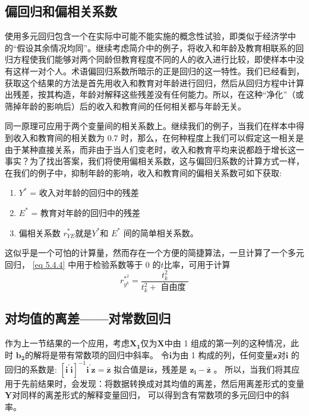 \subsection{偏回归和偏相关系数}

使用多元回归包含一个在实际中可能不能实施的概念性试验，即类似于经济学中的“假设其余情况均同”。继续考虑简介中的例子，将收入和年龄及教育相联系的回归方程使我们能够对两个同龄但教育程度不同的人的收入进行比较，即使样本中没有这样一对个人。术语偏回归系数所暗示的正是回归的这一特性。我们已经看到，获取这个结果的方法是首先用收入和教育对年龄进行回归，然后从回归方程中计算出残差，按其构造，年龄对解释这些残差没有任何能力。所以，在这种“净化”（或筛掉年龄的影响后）后的收入和教育间的任何相关都与年龄无关。

同一原理可应用于两个变量间的相关系数上。继续我们的例子，当我们在样本中得到收入和教育间的相关数为 0.7 时，那么，在何种程度上我们可以假定这一相关是由于某种直接关系，而非由于当人们变老时，收入和教育平均来说都趋于增长这一事实？为了找出答案，我们将使用偏相关系数，这与偏回归系数的计算方式一样，在我们的例子中，抑制年龄的影响，收入和教育间的偏相关系数可如下获取:
\begin{enumerate}
    \item $ Y^{*}$ = 收入对年龄的回归中的残差
    \item $ E^{*}$ = 教育对年龄的回归中的残差
    \item 偏相关系数 $ r_{YE}^{*}$就是$ Y^{*}$和 $ E^{*}$ 间的简单相关系数。
\end{enumerate}

这似乎是一个可怕的计算量，然而存在一个方便的简捷算法，一旦计算了一个多元回归， \ref{eq 5.4.4} 中用于检验系数等于 0 的$ t $比率，可用于计算
\begin{equation}
    r_{y^{k}}^{*^{2}} = \frac{t_{k}^{2}}{t_{k}^{2} + \text { 自由度 }}
\end{equation}

\subsection{对均值的离差——对常数回归}

作为上一节结果的一个应用，考虑$ \boldsymbol{ X_1 } $仅为$ \boldsymbol{ X } $中由 1 组成的第一列的这种情况，此时 $ \boldsymbol{ b_2 } $的解将是带有常数项的回归中斜率。
令$ \boldsymbol{ i } $为由 1 构成的列，任何变量$ \boldsymbol{ z } $对$ \boldsymbol{ i }$ 的回归的系数是:
$ \left[\boldsymbol{ i^{\prime} i}\right]^{-1} \boldsymbol{ i^{\prime} z=\bar{z}} $
拟合值是$ \boldsymbol{ i \bar{z}} $，残差是 $ \boldsymbol{ z_i − \bar{z} }$ 。
所以，当我们将其应用于先前结果时，会发现：将数据转换成对其均值的离差，然后用离差形式的变量$ \boldsymbol{ Y } $对同样的离差形式的解释变量回归，
可以得到含有常数项的多元回归中的斜率。

